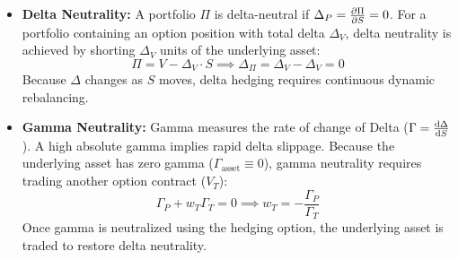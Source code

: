 \begin{itemize}[leftmargin=1.5em, itemsep=3pt]
    \item \textbf{Delta Neutrality:} A portfolio $\Pi$ is delta-neutral if $\Delta_P = \frac{\partial \Pi}{\partial S} = 0$. For a portfolio containing an option position with total delta $\Delta_V$, delta neutrality is achieved by shorting $\Delta_V$ units of the underlying asset:
    \begin{equation}
    \Pi = V - \Delta_V \cdot S \implies \Delta_\Pi = \Delta_V - \Delta_V = 0
    \end{equation}
    Because $\Delta$ changes as $S$ moves, delta hedging requires continuous dynamic rebalancing.
    \item \textbf{Gamma Neutrality:} Gamma measures the rate of change of Delta ($\Gamma = \frac{\mathrm{d} \Delta}{\mathrm{d} S}$). A high absolute gamma implies rapid delta slippage. Because the underlying asset has zero gamma ($\Gamma_{\text{asset}} \equiv 0$), gamma neutrality requires trading another option contract ($V_T$):
    \begin{equation}
    \Gamma_P + w_T \Gamma_T = 0 \implies w_T = -\frac{\Gamma_P}{\Gamma_T}
    \end{equation}
    Once gamma is neutralized using the hedging option, the underlying asset is traded to restore delta neutrality.
\end{itemize}

